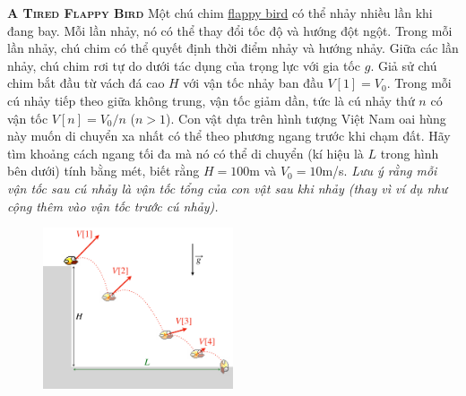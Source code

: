 


\begin{problem}{\textbf{\textsc{A Tired Flappy Bird}}} Một chú chim \href{https://flappybird.io/}{flappy bird} có thể nhảy nhiều lần khi đang bay. Mỗi lần nhảy, nó có thể thay đổi tốc độ và hướng đột ngột. Trong mỗi lần nhảy, chú chim có thể quyết định thời điểm nhảy và hướng nhảy. Giữa các lần nhảy, chú chim rơi tự do dưới tác dụng của trọng lực với gia tốc $g$. Giả sử chú chim bắt đầu từ vách đá cao $H$ với vận tốc nhảy ban đầu $V[1]=V_0$. Trong mỗi cú nhảy tiếp theo giữa không trung, vận tốc giảm dần, tức là cú nhảy thứ $n$ có vận tốc $V[n]=V_0/n$ ($n>1$). Con vật dựa trên hình tượng Việt Nam oai hùng này muốn di chuyển xa nhất có thể theo phương ngang trước khi chạm đất. Hãy tìm khoảng cách ngang tối đa mà nó có thể di chuyển (kí hiệu là $L$ trong hình bên dưới) tính bằng mét, biết rằng $H=100$m và $V_0=10$m/s. \textit{Lưu ý rằng mỗi vận tốc sau cú nhảy là vận tốc tổng của con vật sau khi nhảy (thay vì ví dụ như cộng thêm vào vận tốc trước cú nhảy).}
	
	\FloatBarrier
	\begin{figure}[!htbp]
		\centering
		\includegraphics[width=0.5\textwidth]{problems/figures/flappybird.png}
	\end{figure}
	\FloatBarrier
	
\end{problem}